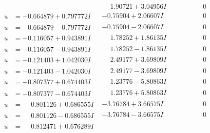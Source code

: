 \documentclass[1p]{elsarticle_modified}
\theoremstyle{definition}
\begin{document}
$$\begin{array}{c|c|c}
 & \phantom{-}1.90721 + 3.04956 I & \phantom{-0.000000 } 0 \\ \hline\begin{aligned}
u &= -0.664879 + 0.797772 I\end{aligned}
 & -0.75904 + 2.06607 I & \phantom{-0.000000 } 0 \\ \hline\begin{aligned}
u &= -0.664879 - 0.797772 I\end{aligned}
 & -0.75904 - 2.06607 I & \phantom{-0.000000 } 0 \\ \hline\begin{aligned}
u &= -0.116057 + 0.943891 I\end{aligned}
 & \phantom{-}1.78252 + 1.86135 I & \phantom{-0.000000 } 0 \\ \hline\begin{aligned}
u &= -0.116057 - 0.943891 I\end{aligned}
 & \phantom{-}1.78252 - 1.86135 I & \phantom{-0.000000 } 0 \\ \hline\begin{aligned}
u &= -0.121403 + 1.042030 I\end{aligned}
 & \phantom{-}2.49177 + 3.69809 I & \phantom{-0.000000 } 0 \\ \hline\begin{aligned}
u &= -0.121403 - 1.042030 I\end{aligned}
 & \phantom{-}2.49177 - 3.69809 I & \phantom{-0.000000 } 0 \\ \hline\begin{aligned}
u &= -0.807377 + 0.674403 I\end{aligned}
 & \phantom{-}1.23776 - 5.80863 I & \phantom{-0.000000 } 0 \\ \hline\begin{aligned}
u &= -0.807377 - 0.674403 I\end{aligned}
 & \phantom{-}1.23776 + 5.80863 I & \phantom{-0.000000 } 0 \\ \hline\begin{aligned}
u &= \phantom{-}0.801126 + 0.686555 I\end{aligned}
 & -3.76784 + 3.66575 I & \phantom{-0.000000 } 0 \\ \hline\begin{aligned}
u &= \phantom{-}0.801126 - 0.686555 I\end{aligned}
 & -3.76784 - 3.66575 I & \phantom{-0.000000 } 0 \\ \hline\begin{aligned}
u &= \phantom{-}0.812471 + 0.676289 I\end{aligned}

\end{array}$$
\end{document}
